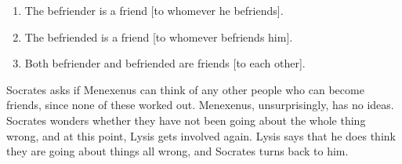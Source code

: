 \documentclass[11pt]{article}
\begin{document}
\begin{enumerate}
    \item The befriender is a friend [to whomever he befriends].
    \item The befriended is a friend [to whomever befriends him].
    \item Both befriender and befriended are friends [to each other].
\end{enumerate}

Socrates asks if Menexenus can think of any other people who can become friends, since none of these worked out.  Menexenus, unsurprisingly, has no ideas.  Socrates wonders whether they have not been going about the whole thing wrong, and at this point, Lysis gets involved again.  Lysis says that he does think they are going about things all wrong, and Socrates turns back to him.

\newpage


\end{document}
